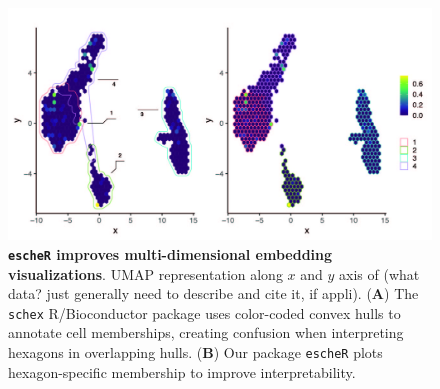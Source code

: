 \documentclass[10pt,twocolumn]{article}
\newcommand{\fixme}[1]{{\color{red} (#1)}}
\begin{document}
\begin{figure}[!h]
\begin{center}
\includegraphics[width=\textwidth]{Manuscript/figure/embedding.jpg}
\caption{\small \textbf{\texttt{escheR} improves multi-dimensional embedding visualizations}. UMAP representation along $x$ and $y$ axis of \fixme{what data? just generally need to describe and cite it, if appli}. (\textbf{A}) The \texttt{schex} R/Bioconductor package uses color-coded convex hulls to annotate cell memberships, creating confusion when interpreting hexagons in overlapping hulls. (\textbf{B}) Our package \texttt{escheR} plots hexagon-specific membership to improve interpretability.}
\label{fig:embedding} 
\end{center}
\end{figure}
\end{document}
